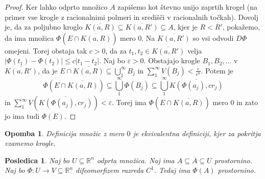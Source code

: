 \documentclass[10pt, a4paper]{article}
\newtheorem{posledica}[izr]{Posledica}
\newtheorem*{opomba}{Opomba}
\newenvironment{noticeC}{%
  \tcolorbox[%
  notitle,
  empty,
  enhanced,  %
  breakable,
  coltext=black, 
  fontupper=\rmfamily,
  parbox=false,
  noparskip,
  sharp corners,
  boxrule=-1pt,  %
  frame hidden,
  left=7pt,  %
  right=7pt,
  top=5pt,
  bottom=5pt,
  before skip=2.5ex plus 2pt,
  after skip=2.5ex plus 2pt,
  overlay unbroken and last={%
  },
  ]}
{\endtcolorbox}
\newenvironment{dokaz}%
  {\begin{noticeC}\begin{proof}}%
  {\end{proof}\end{noticeC}}
\newcommand{\R}{\mathbb {R}}
\begin{document}
\begin{dokaz}
    Ker lahko odprto množico $A$ zapišemo kot števno unijo zaprtih krogel 
    (na primer vse krogle z racionalnimi polmeri in središči v racionalnih točkah).
    Dovolj je, da za poljubno kroglo $\overline{K(a, R)} \subseteq \overline{K(a, R')} \subseteq A$,
    kjer je $R < R'$, pokažemo, da ima množica $\Phi (E \cap \overline{K(a, R)})$ mero $0$.
    Na $\overline{K(a, R')}$ so vsi odvodi $D \Phi$ omejeni.
    Torej obstaja tak $c > 0$, da za $t_1, t_2 \in \overline{K(a, R')}$
    velja $|\Phi (t_1) - \Phi (t_2)| \leq c |t_1 - t_2|.$
    Naj bo $\varepsilon > 0$. Obstajajo krogle $B_1, B_2, \dots$ v $\overline{K(a, R')}$,
    da je $E \cap \overline{K(a, R)} \subseteq \bigcup_1 ^\infty B_j$ in $\sum_1 ^\infty V(B_j) < \frac{\varepsilon}{c^n}$.
    Potem je $$\Phi (E \cap \overline{K(a, R)}) \subseteq \bigcup_1 ^\infty \Phi(B_j) \subseteq \bigcup_1 ^\infty \overline{K(\Phi(a_j), cr_j)}$$
    in $\sum_1 ^\infty V(\overline{K(\Phi(a_j), cr_j)}) < \varepsilon$.
    Torej ima $\Phi (E \cap \overline{K(a, R)})$ mero $0$ in zato jo ima tudi $\Phi(E)$.
\end{dokaz}

\begin{opomba}
    Definicija množic z mero $0$ je ekvivalentna definiciji, kjer za pokritja vzamemo krogle.
\end{opomba}

\begin{posledica}
    Naj bo $U \subseteq \R^n$ odprta množica. Naj ima $A \subseteq \overline{A} \subseteq U$
    prostornino.
    Naj bo $\Phi: U \to V \subseteq \R^n$ difeomorfizem razreda $C^1$.
    Tedaj ima $\Phi(A)$ prostornino.
\end{posledica}
\end{document}

